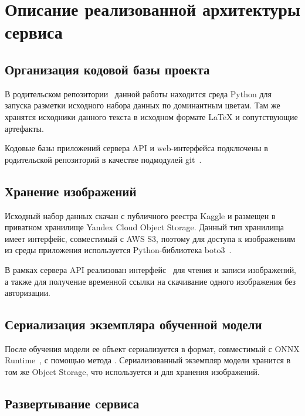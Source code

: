 \documentclass[a4paper,12pt]{extarticle}
\begin{document}
\newpage
\section{Описание реализованной архитектуры сервиса}

\subsection{Организация кодовой базы проекта}

В родительском репозитории~\cite{gradwork} данной работы находится среда Python для запуска разметки
исходного набора данных по доминантным цветам. Там же хранятся исходники данного текста в исходном
формате LaTeX и сопутствующие артефакты.\par

Кодовые базы приложений сервера API и web-интерфейса подключены в родительской репозиторий в качестве
подмодулей git~\cite{submodules}.

\subsection{Хранение изображений}

Исходный набор данных скачан с публичного реестра Kaggle и размещен в приватном хранилище Yandex
Cloud Object Storage. Данный тип хранилища имеет интерфейс, совместимый с AWS S3,
поэтому для доступа к изображениям из среды приложения используется Python-библиотека
boto3~\cite{boto3}.\par

В рамках сервера API реализован интерфейс~\cite{coreS3} для чтения и записи изображений, а также для
получение временной ссылки на скачивание одного изображения без авторизации.

\subsection{Сериализация экземпляра обученной модели}

После обучения модели ее объект сериализуется в формат, совместимый с ONNX Runtime~\cite{ONNX}, с
помощью метода . Сериализованный экземпляр модели хранится в том же
Object Storage, что используется и для хранения изображений.

\subsection{Развертывание cервиса}
\end{document}
